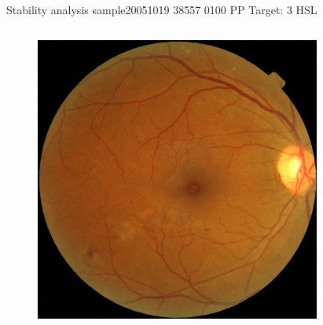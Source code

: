 \documentclass{beamer}
\begin{document}
\begin{frame}{Stability analysis sample}{20051019 38557 0100 PP Target: 3 HSL}
\begin{columns}
\begin{column}{0.3\textwidth}
	\begin{figure}[p]
		\centering
		\includegraphics[width=\textwidth]{chapter_stability/20051019_38557_0100_PP/20051019_38557_0100_PP.jpeg}
	\end{figure}	
\end{column}
\begin{column}{0.45\textwidth}  %
	\begin{figure}[p]
		\centering

\end{figure}
\end{column}
\end{columns}
\end{frame}
\end{document}
